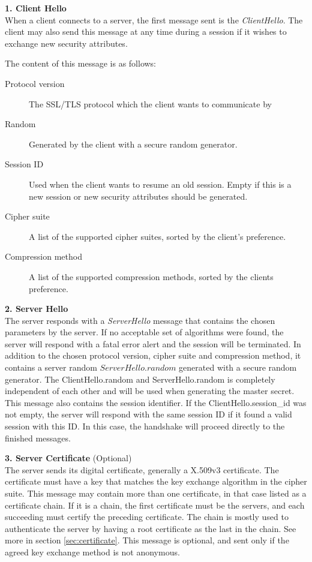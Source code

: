 \documentclass[12pt,a4paper,titlepage]{report}
\begin{document}
\textbf{1. Client Hello}\\ 
When a client connects to a server, the first message sent is the \emph{ClientHello}. The client may also send this message at any time during a session if it wishes to exchange new security attributes. 

The content of this message is as follows:

\begin{description}
\item[Protocol version] {The SSL/TLS protocol which the client wants to communicate by}
\item[Random] {Generated by the client with a secure random generator.}
\item[Session ID] {Used when the client wants to resume an old session. Empty if this is a new session or new security attributes should be generated.}
\item[Cipher suite] {A list of the supported cipher suites, sorted by the client's preference. }
\item[Compression method] {A list of the supported compression methods, sorted by the clients preference.}
\end{description}

\textbf{2. Server Hello}\\
The server responds with a \emph{ServerHello} message that contains the chosen parameters by the server. If no acceptable set of algorithms	were found, the server will respond with a fatal error alert and the session will be terminated. In addition to the chosen protocol version, cipher suite and compression method, it contains a server random \(ServerHello.random\) generated with a secure random generator. The ClientHello.random and ServerHello.random is completely independent of each other and will be used when generating the master secret. This message also contains the session identifier. If the ClientHello.session\_id was not empty, the server will respond with the same session ID if it found a valid session with this ID. In this case, the handshake will proceed directly to the finished messages.

\textbf{3. Server Certificate} (Optional)\\
The server sends its digital certificate, generally a X.509v3 certificate. The certificate must have a key that matches the key exchange algorithm in the cipher suite. This message may contain more than one certificate, in that case listed as a certificate chain. If it is a chain, the first certificate must be the servers, and each succeeding must certify the preceding certificate. The chain is mostly used to authenticate the server by having a root certificate as the last in the chain. See more in section \ref{sec:certificate}. This message is optional, and sent only if the agreed key exchange method is not anonymous.
\end{document}
